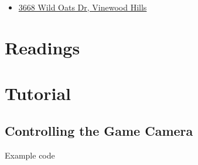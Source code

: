 \documentclass[
  openany]{book}
\providecommand{\tightlist}{%
  \setlength{\itemsep}{0pt}\setlength{\parskip}{0pt}}
\begin{document}
\begin{itemize}
\tightlist
\item
  \href{https://grandtheftdata.com/landmarks/\#-94.207,530.818,5,atlas,name=3668,3668_Wild_Oats_Dr,_Vinewood_Hills}{3668 Wild Oats Dr, Vinewood Hills}
\end{itemize}

\hypertarget{readings-6}{%
\section*{Readings}\label{readings-6}}

\hypertarget{tutorial-6}{%
\section*{Tutorial}\label{tutorial-6}}

\hypertarget{controlling-the-game-camera}{%
\subsection*{Controlling the Game Camera}\label{controlling-the-game-camera}}

Example code
\end{document}
